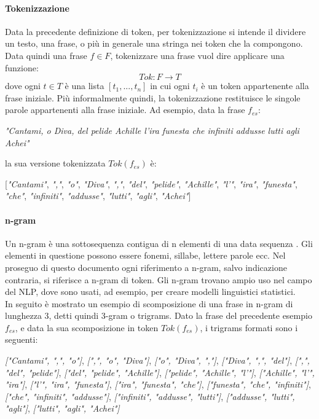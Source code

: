 \paragraph{Tokenizzazione}
Data la precedente definizione di token, per tokenizzazione si intende il dividere un testo, una frase, o più in generale una stringa nei token che la compongono. Data quindi una frase $f \in F$, tokenizzare una frase vuol dire applicare una funzione:
\begin{equation}
\textit{Tok}: F \rightarrow T
\end{equation}
dove ogni $t \in T$ è una lista $[t_1,...,t_n]$ in cui ogni $t_i$ è un token appartenente alla frase iniziale.
Più informalmente quindi, la tokenizzazione restituisce le singole parole appartenenti alla frase iniziale. Ad esempio, data la frase $f_{es}$:
\begin{center}
\textit{"Cantami, o Diva, del pelide Achille
l'ira funesta che infiniti addusse
lutti agli Achei"}
\end{center}
la sua versione tokenizzata $\textit{Tok}(f_{es})$ è:
\begin{center}
[\textit{"Cantami"},
\textit{","},
\textit{"o"},
\textit{"Diva"},
\textit{","},
\textit{"del"},
\textit{"pelide"},
\textit{"Achille"},
\textit{"l'"},
\textit{"ira"},
\textit{"funesta"},
\textit{"che"},
\textit{"infiniti"},
\textit{"addusse"},
\textit{"lutti"},
\textit{"agli"},
\textit{"Achei"}]
\end{center}

\paragraph{n-gram} Un n-gram è una sottosequenza contigua di n elementi di una data sequenza \cite{itwiki:ngram}. Gli elementi in questione possono essere fonemi, sillabe, lettere parole ecc. Nel proseguo di questo documento ogni riferimento a n-gram, salvo indicazione contraria, si riferisce a n-gram di token. Gli n-gram trovano ampio uso nel campo del NLP, dove sono usati, ad esempio, per creare modelli linguistici statistici.\\
In seguito è mostrato un esempio di scomposizione di una frase in n-gram di lunghezza 3, detti quindi 3-gram o trigrams. Dato la frase del precedente esempio $f_{es}$, e data la sua scomposizione in token $\textit{Tok}(f_{es})$, i trigrams formati sono i seguenti:
\begin{center}
\textit{["Cantami", ",", "o"]}, \textit{[",", "o", "Diva"]}, \textit{["o", "Diva", ","]}, \textit{["Diva", ",", "del"]}, \textit{[",", "del", "pelide"]}, \textit{["del", "pelide", "Achille"]}, \textit{["pelide", "Achille", "l'"]}, \textit{["Achille", "l'", "ira"]}, \textit{["l'", "ira", "funesta"]}, \textit{["ira", "funesta", "che"]}, \textit{["funesta", "che", "infiniti"]}, \textit{["che", "infiniti", "addusse"]}, \textit{["infiniti", "addusse", "lutti"]}, \textit{["addusse", "lutti", "agli"]}, \textit{["lutti", "agli", "Achei"]}
\end{center}


